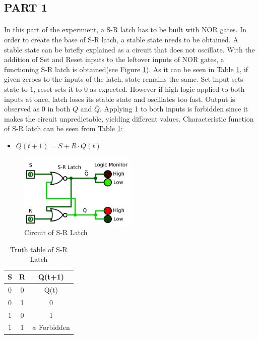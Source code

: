 \documentclass[pdftex,12pt,a4paper]{article}
\begin{document}
\begin{flushleft}
\subsection{PART 1}



\paragraph{}
In this part of the experiment, a S-R latch has to be built with NOR gates. In order to create the base of S-R latch, a stable state needs to be obtained. A stable state can be briefly explained as a circuit that does not oscillate. With the addition of Set and Reset inputs to the leftover inputs of NOR gates, a functioning S-R latch is obtained(see Figure \ref{fig:part1}). As it can be seen in Table \ref{table:part1}, if given zeroes to the inputs of the latch, state remains the same. Set input sets state to 1, reset sets it to 0 as expected. However if high logic applied to both inputs at once, latch loses its stable state and oscillates too fast. Output is observed as 0 in both $Q$ and $\bar{Q}$. Applying 1 to both inputs is forbidden since it makes the circuit unpredictable, yielding different values. Characteristic function of S-R latch can be seen from Table \ref{table:part1}:

\begin{itemize}
    \item $Q(t+1) = S + \bar{R} \cdot Q(t)$
\end{itemize}



\begin{figure}[h]
	\centering
	\includegraphics[width=0.5\textwidth]{part1.png}	
	\caption{Circuit of S-R Latch}
	\label{fig:part1}
\end{figure}




\begin{table}[h]
\begin{tabular}{cc|c}
S & R & Q(t+1)                \\ \hline
0 & 0 & Q(t)                \\
0 & 1 & 0                \\
1 & 0 & 1                \\
1 & 1 & $\phi$ Forbidden
\end{tabular}
\centering
\caption{Truth table of S-R Latch}
\label{table:part1}
\end{table}


\end{flushleft}
\end{document}
